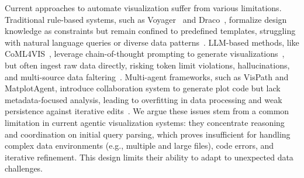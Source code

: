 Current approaches to automate visualization suffer from various limitations. Traditional rule-based systems, such as Voyager~\citep{10.1145/3025453.3025768,7192728} and Draco~\citep{yang2023draco}, formalize design knowledge as constraints but remain confined to predefined templates, struggling with natural language queries or diverse data patterns~\citep{wu2024automated,hoque2025natural}. 
LLM-based methods, like CoML4VIS~\citep{chen2024viseval}, leverage chain-of-thought prompting to generate visualizations~\citep{comanici2025gemini}, but often ingest raw data directly, risking token limit violations, hallucinations, and multi-source data faltering~\citep{bai2024hallucination,chen2024viseval}.
Multi-agent frameworks, such as VisPath and MatplotAgent, introduce collaboration system to generate plot code but lack metadata-focused analysis, leading to overfitting in data processing and weak persistence against iterative edits~\citep{seo2025automated,yang2024matplotagent}. 
We argue these issues stem from a common limitation in current agentic visualization systems: they concentrate reasoning and coordination on initial query parsing, which proves insufficient for handling complex data environments (e.g., multiple and large files), code errors, and iterative refinement. This design limits their ability to
adapt to unexpected data challenges.


